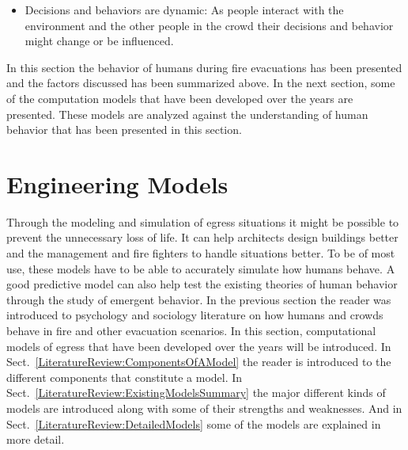 \begin{itemize}
\item Decisions and behaviors are dynamic: As people interact with the environment and the other people in the crowd their decisions and behavior might change or be influenced.
\end{itemize}

In this section the behavior of humans during fire evacuations has been presented and the factors discussed has been summarized above. In the next section, some of the computation models that have been developed over the years are presented. These models are analyzed against the understanding of human behavior that has been presented in this section.

\section{Engineering Models}
\label{LiteratureReview:EngineeringModels}

Through the modeling and simulation of egress situations it might be possible to prevent the unnecessary loss of life. It can help architects design buildings better and the management and fire fighters to handle situations better. To be of most use, these models have to be able to accurately simulate how humans behave. A good predictive model can also help test the existing theories of human behavior through the study of emergent behavior. In the previous section the reader was introduced to psychology and sociology literature on how humans and crowds behave in fire and other evacuation scenarios. In this section, computational models of egress that have been developed over the years will be introduced. In Sect.~\ref{LiteratureReview:ComponentsOfAModel} the reader is introduced to the different components that constitute a model. In Sect.~\ref{LiteratureReview:ExistingModelsSummary} the major different kinds of models are introduced along with some of their strengths and weaknesses. And in Sect.~\ref{LiteratureReview:DetailedModels} some of the models are explained in more detail.

